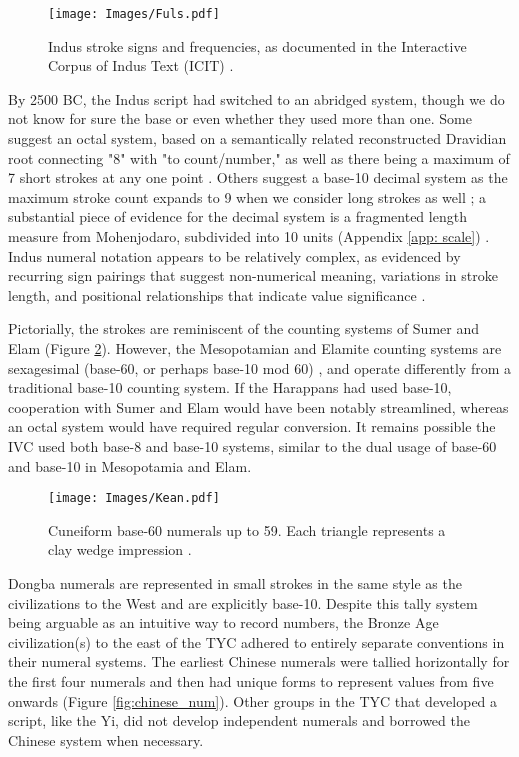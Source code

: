 \documentclass[11pt,a4paper,oneside]{report}
\begin{document}
\begin{figure}[H] 
    \centering
    \texttt{[image: Images/Fuls.pdf]}
    \caption [Indus Stroke Signs]{Indus stroke signs and frequencies, as documented in the Interactive Corpus of Indus Text (ICIT) \cite{fuls_ancient_2020, wells_interactive_2024}.}
    \label{fig:strokes}
\end{figure}

By 2500 BC, the Indus script had switched to an abridged system, though we do not know for sure the base or even whether they used more than one. Some suggest an octal system, based on a semantically related reconstructed Dravidian root connecting "8" with "to count/number," as well as there being a maximum of 7 short strokes at any one point \cite{fuls_ancient_2020, mcalpin_toward_1974, fairservis_harappan_1992}. Others suggest a base-10 decimal system as the maximum stroke count expands to 9 when we consider long strokes as well \cite{wells_epigraphic_2011}; a substantial piece of evidence for the decimal system is a fragmented length measure from Mohenjodaro, subdivided into 10 units (Appendix \ref{app: scale}) \cite{guha_history_2022, mackay_household_1938}. Indus numeral notation appears to be relatively complex, as evidenced by recurring sign pairings that suggest non-numerical meaning, variations in stroke length, and positional relationships that indicate value significance \cite{fuls_ancient_2020}. 

Pictorially, the strokes are reminiscent of the counting systems of Sumer and Elam (Figure \ref{fig:base-60}). However, the Mesopotamian and Elamite counting systems are sexagesimal (base-60, or perhaps base-10 mod 60) \cite{friberg_numbers_1984, friberg_three_2019}, and operate differently from a traditional base-10 counting system. If the Harappans had used base-10, cooperation with Sumer and Elam would have been notably streamlined, whereas an octal system would have required regular conversion. It remains possible the IVC used both base-8 and base-10 systems, similar to the dual usage of base-60 and base-10 in Mesopotamia and Elam.

\begin{figure}[H] 
    \centering
    \texttt{[image: Images/Kean.pdf]}
    \caption[Cuneiform Base-60 Numerals]{Cuneiform base-60 numerals up to 59. Each triangle represents a clay wedge impression \cite{chew_base_2019}.}
    \label{fig:base-60}
\end{figure}

Dongba numerals are represented in small strokes in the same style as the civilizations to the West and are explicitly base-10. Despite this tally system being arguable as an intuitive way to record numbers, the Bronze Age civilization(s) to the east of the TYC adhered to entirely separate conventions in their numeral systems. The earliest Chinese numerals were tallied horizontally for the first four numerals and then had unique forms to represent values from five onwards (Figure \ref{fig:chinese_num}). Other groups in the TYC that developed a script, like the Yi, did not develop independent numerals and borrowed the Chinese system when necessary.
\end{document}
